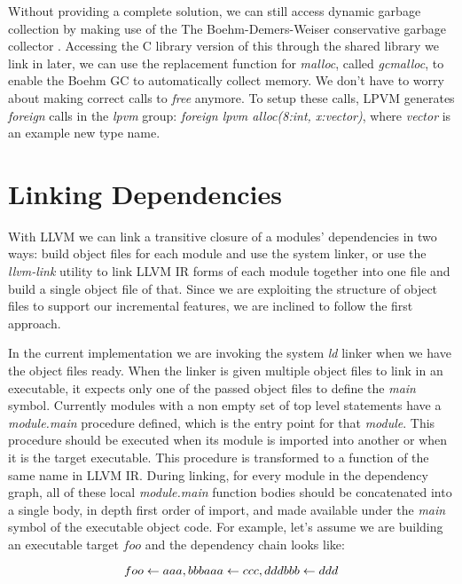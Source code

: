 Without providing a complete solution, we can still access dynamic garbage
collection by making use of the The Boehm-Demers-Weiser conservative garbage
collector \citep{boehmgc}. Accessing the C library version of this through the
shared library we link in later, we can use the replacement function for
\textit{malloc}, called \textit{gc\textunderscore malloc}, to enable the Boehm
GC to automatically collect memory. We don't have to worry about making correct
calls to \textit{free} anymore. To setup these calls, LPVM generates
\textit{foreign} calls in the \textit{lpvm} group: \textit{foreign lpvm
  alloc(8:int, x:vector)}, where \textit{vector} is an example new type name.


\section{Linking Dependencies}
\label{sec:linking}

With LLVM we can link a transitive closure of a modules' dependencies in two
ways: build object files for each module and use the system linker, or use the
\textit{llvm-link} utility to link LLVM IR forms of each module together into
one file and build a single object file of that. Since we are exploiting the
structure of object files to support our incremental features, we are inclined
to follow the first approach.

In the current implementation we are invoking the system \textit{ld} linker
when we have the object files ready. When the linker is given multiple object
files to link in an executable, it expects only one of the passed object files
to define the \textit{main} symbol. Currently modules with a non empty set of
top level statements have a \textit{module.main} procedure defined, which is
the entry point for that \textit{module}. This procedure should be executed
when its module is imported into another or when it is the target
executable. This procedure is transformed to a function of the same name in
LLVM IR. During linking, for every module in the dependency graph, all of these
local \textit{module.main} function bodies should be concatenated into a single
body, in depth first order of import, and made available under the
\textit{main} symbol of the executable object code. For example, let's assume
we are building an executable target $foo$ and the dependency chain looks like:

\begin{equation*}
  foo \leftarrow aaa,bbb \\
  aaa \leftarrow ccc,ddd \\
  bbb \leftarrow ddd
\end{equation*}

